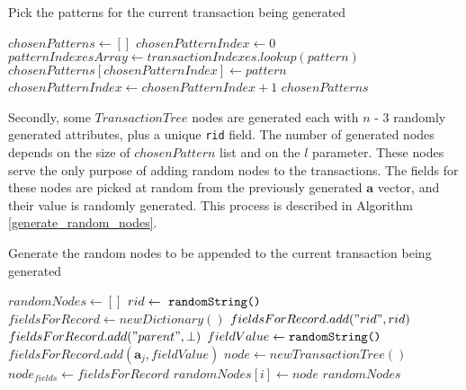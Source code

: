 \documentclass{acm_proc_article-sp-sigmod09}
\begin{document}
\begin{algorithm}
\caption{Pick the patterns for the current transaction being generated}
\label{pick_patterns}
\begin{algorithmic}[1]
\State $chosenPatterns \gets []$
\State $chosenPatternIndex \gets 0$
        \State $patternIndexesArray \gets transactionIndexes.lookup(pattern)$
            \State $chosenPatterns[chosenPatternIndex] \gets pattern$
            \State $chosenPatternIndex \gets chosenPatternIndex + 1$
        \EndIf
    \EndFor
\EndFor
\Return $chosenPatterns$
\EndFunction
\end{algorithmic}
\end{algorithm}

Secondly, some $TransactionTree$ nodes are generated each with $n$ - 3 randomly generated attributes, plus a unique \texttt{rid} field. The number of generated nodes depends on the size of $chosenPattern$ list and on the $l$ parameter. These nodes serve the only purpose of adding random nodes to the transactions. The fields for these nodes are picked at random from the previously generated $\boldsymbol{a}$ vector, and their value is randomly generated. This process is described in Algorithm \ref{generate_random_nodes}.

\begin{algorithm}
\caption{Generate the random nodes to be appended to the current transaction being generated}
\label{generate_random_nodes}
\begin{algorithmic}[1]
\State $randomNodes \gets []$
    \State $rid \gets \text{ \texttt{randomString() }}$
    \State $fieldsForRecord \gets new Dictionary()$
    \State $fieldsForRecord.add("rid", rid)$
    \State $fieldsForRecord.add("parent", \bot)$
        \State $fieldValue \gets \text{\texttt{randomString()}}$
        \State $fieldsForRecord.add(\boldsymbol{a}_j, fieldValue)$
    \EndFor
    \State $node \gets new TransactionTree()$ 
    \State $node_{fields} \gets fieldsForRecord$
    \State $randomNodes[i] \gets node$
\EndFor
\Return $randomNodes$
\EndFunction
\end{algorithmic}
\end{algorithm}
\end{document}
